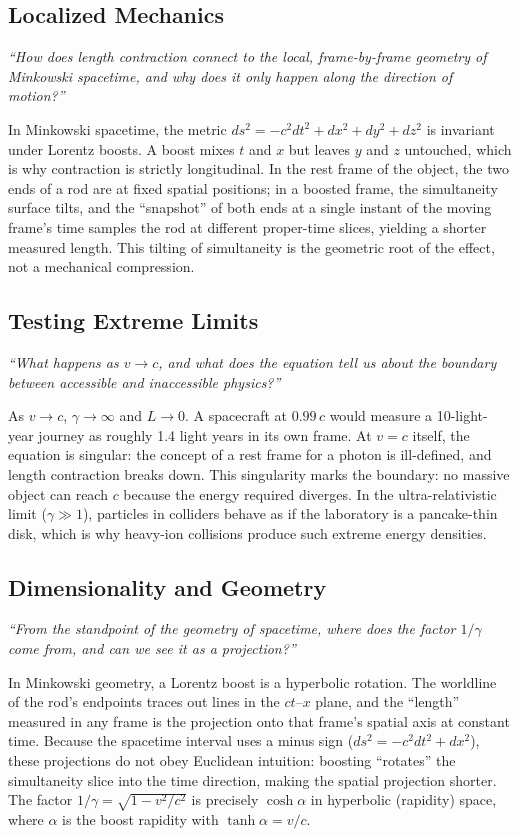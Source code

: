 \documentclass[11pt,openright]{book}
\begin{document}
\subsection*{Localized Mechanics}
\textit{``How does length contraction connect to the local, frame-by-frame geometry of Minkowski spacetime, and why does it only happen along the direction of motion?''}

In Minkowski spacetime, the metric $ds^{2} = -c^{2}dt^{2} + dx^{2} + dy^{2} + dz^{2}$ is invariant under Lorentz boosts. A boost mixes $t$ and $x$ but leaves $y$ and $z$ untouched, which is why contraction is strictly longitudinal. In the rest frame of the object, the two ends of a rod are at fixed spatial positions; in a boosted frame, the simultaneity surface tilts, and the ``snapshot'' of both ends at a single instant of the moving frame's time samples the rod at different proper-time slices, yielding a shorter measured length. This tilting of simultaneity is the geometric root of the effect, not a mechanical compression.

\subsection*{Testing Extreme Limits}
\textit{``What happens as $v \to c$, and what does the equation tell us about the boundary between accessible and inaccessible physics?''}

As $v \to c$, $\gamma \to \infty$ and $L \to 0$. A spacecraft at $0.99\,c$ would measure a 10-light-year journey as roughly 1.4 light years in its own frame. At $v = c$ itself, the equation is singular: the concept of a rest frame for a photon is ill-defined, and length contraction breaks down. This singularity marks the boundary: no massive object can reach $c$ because the energy required diverges. In the ultra-relativistic limit ($\gamma \gg 1$), particles in colliders behave as if the laboratory is a pancake-thin disk, which is why heavy-ion collisions produce such extreme energy densities.

\subsection*{Dimensionality and Geometry}
\textit{``From the standpoint of the geometry of spacetime, where does the factor $1/\gamma$ come from, and can we see it as a projection?''}

In Minkowski geometry, a Lorentz boost is a hyperbolic rotation. The worldline of the rod's endpoints traces out lines in the $ct$--$x$ plane, and the ``length'' measured in any frame is the projection onto that frame's spatial axis at constant time. Because the spacetime interval uses a minus sign ($ds^{2} = -c^{2}dt^{2} + dx^{2}$), these projections do not obey Euclidean intuition: boosting ``rotates'' the simultaneity slice into the time direction, making the spatial projection shorter. The factor $1/\gamma = \sqrt{1 - v^{2}/c^{2}}$ is precisely $\cosh\alpha$ in hyperbolic (rapidity) space, where $\alpha$ is the boost rapidity with $\tanh\alpha = v/c$.
\end{document}
